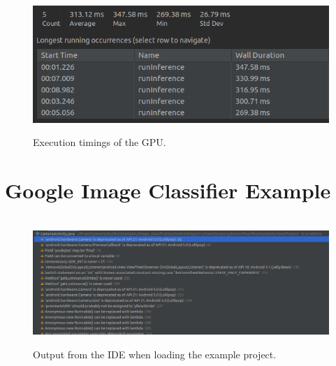 \documentclass[12pt,a4paper]{report}
\begin{document}
\begin{figure}[h]\
    \includegraphics[width=\textwidth]{GPU_Time.png}
    \caption{Execution timings of the GPU.}
    \label{fig:gpu}
\end{figure}

\clearpage

\section{Google Image Classifier Example}

\begin{figure}[h]\
    \includegraphics[width=\textwidth]{Depracated.png}
    \caption{Output from the IDE when loading the example project.}
    \label{fig:depracated}
\end{figure}

\break
\end{document}
